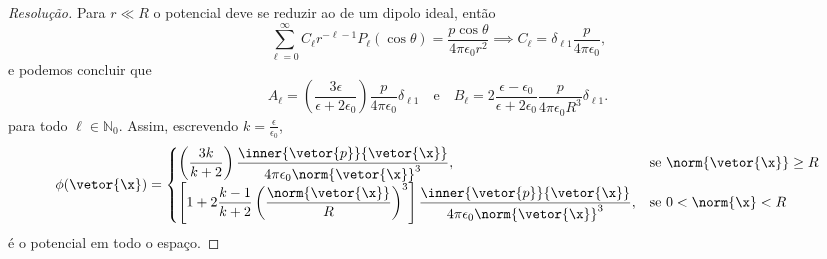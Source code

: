 \begin{proof}[Resolução]
    Para \(r \ll R\) o potencial deve se reduzir ao de um dipolo ideal, então
    \begin{equation*}
        \sum_{\ell = 0}^\infty C_\ell r^{-\ell - 1}P_\ell(\cos\theta) = \frac{p \cos\theta}{4\pi \epsilon_0 r^2} \implies C_\ell = \delta_{\ell 1} \frac{p}{4\pi \epsilon_0},
    \end{equation*}
    e podemos concluir que
    \begin{equation*}
        A_\ell = \left(\frac{3 \epsilon}{\epsilon + 2\epsilon_0}\right) \frac{p}{4\pi \epsilon_0}\delta_{\ell 1}  \quad\text{e}\quad
        B_\ell = 2\frac{\epsilon - \epsilon_0}{\epsilon + 2\epsilon_0 } \frac{p}{4\pi \epsilon_0 R^{3}} \delta_{\ell 1}.
    \end{equation*}
    para todo \(\ell \in \mathbb{N}_0\). Assim, escrevendo \(k = \frac{\epsilon}{\epsilon_0}\),
    \begin{equation*}
        \phi(\vetor{\x}) = \begin{cases}
            \displaystyle \left(\frac{3 k}{k + 2}\right) \frac{\inner{\vetor{p}}{\vetor{\x}}}{4\pi \epsilon_0 \norm{\vetor{\x}}^3},&\text{se }\norm{\vetor{\x}} \geq R\\
            \displaystyle \left[1 + 2\frac{k - 1}{k + 2}\left(\frac{\norm{\vetor{\x}}}{R}\right)^3\right]\frac{\inner{\vetor{p}}{\vetor{\x}}}{4\pi \epsilon_0\norm{\vetor{\x}}^3},&\text{se }0 < \norm{\x} < R
        \end{cases}
    \end{equation*}
    é o potencial em todo o espaço.


\end{proof}
